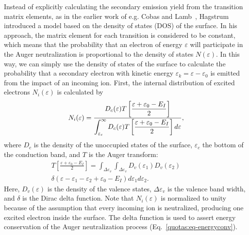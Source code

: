 \begin{refsection}
Instead of explicitly calculating the secondary emission yield from the 
transition matrix elements, as in the earlier work of e.g. Cobas and 
Lamb~\cite{Cobas1944}, Hagstrum introduced a model based on the density of 
states (DOS) of the surface. In his approach, the matrix element for each 
transition is considered to be constant, which means that the probability that 
an electron of energy $\varepsilon$ will participate in the Auger 
neutralization is proportional to the density of states $N(\varepsilon)$. In 
this way, we can simply use the density of states of the surface to calculate 
the probability that a secondary electron with kinetic energy $\varepsilon_k = 
\varepsilon - \varepsilon_0$ is emitted from the impact of an incoming ion. 
First, the internal distribution of excited electrons $N_i(\varepsilon)$ is 
calculated by 
\begin{equation} \label{quotas:eq-excite} 
N_i(\varepsilon) = \frac{\displaystyle D_c(\varepsilon)T\left[\frac{\varepsilon + 
\varepsilon_0 - E_I}{2}\right]}{\displaystyle \int_{\varepsilon_c}^\infty D_c 
(\varepsilon)T\left[\frac{\varepsilon + \varepsilon_0 - 
E_I}{2}\right]d\varepsilon}, 
\end{equation} 
where $D_c$ is the density of the unoccupied states of the surface, 
$\varepsilon_c$ the bottom of the conduction band, and $T$ is the Auger 
transform: 
\begin{equation} 
\begin{aligned} 
T\left[\frac{\varepsilon + \varepsilon_0 - E_I}{2}\right] = 
\int_{\Delta\varepsilon_v}\int_{\Delta\varepsilon_v} D_v (\varepsilon_1) D_v 
(\varepsilon_2) \hspace{3em} \\ \delta(\varepsilon - \varepsilon_1 - 
\varepsilon_2 + \varepsilon_0 - E_I) d\varepsilon_1 d\varepsilon_2. 
\end{aligned} 
\end{equation} 
Here, $D_v(\varepsilon)$ is the density of the valence states, 
$\Delta\varepsilon_v$ is the valence band width, and $\delta$ is the Dirac 
delta function. Note that $N_i(\varepsilon)$ is normalized to unity because of 
the assumption that every incoming ion is neutralized, producing one excited 
electron inside the surface. The delta function is used to assert energy 
conservation of the Auger neutralization process 
(Eq.~\ref{quotas:eq-energyconv}). \\ 
 

\end{refsection}
